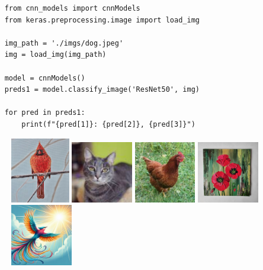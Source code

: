 \begin{solution}
\begin{lstlisting}
    from cnn_models import cnnModels
    from keras.preprocessing.image import load_img
    
    img_path = './imgs/dog.jpeg'
    img = load_img(img_path)
    
    model = cnnModels()    
    preds1 = model.classify_image('ResNet50', img)
    
    for pred in preds1:
        print(f"{pred[1]}: {pred[2]}, {pred[3]}")
\end{lstlisting}

\end{solution}
\vspace{0.5em}
\begin{figure}[h]%
\centering 
\includegraphics[width=0.23\textwidth]{imgs/bird.jpg}
\includegraphics[width=0.24\textwidth]{imgs/cat.jpg}
\includegraphics[width=0.24\textwidth]{imgs/chicken.jpg}
\includegraphics[width=0.24\textwidth]{imgs/flower.jpg}
\includegraphics[width=0.24\textwidth]{imgs/bird.jpeg}

\end{figure}
